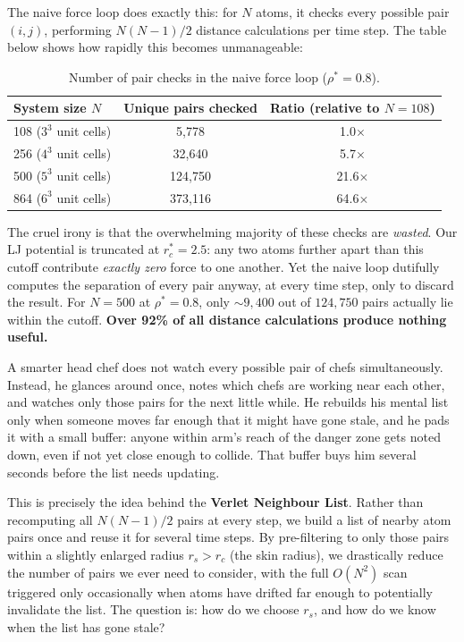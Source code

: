 The naive force loop does exactly this: for $N$ atoms, it checks every possible pair $(i, j)$, performing $N(N-1)/2$ distance calculations per time step. The table below shows how rapidly this becomes unmanageable:

\begin{table}[H]
    \centering
    \caption{Number of pair checks in the naive force loop ($\rho^* = 0.8$).}
    \label{tab:scaling}
    \begin{tabular}{lcc}
        \toprule
        \textbf{System size $N$} & \textbf{Unique pairs checked} & \textbf{Ratio (relative to $N=108$)} \\
        \midrule
        108  ($3^3$ unit cells) & 5{,}778   & 1.0$\times$ \\
        256  ($4^3$ unit cells) & 32{,}640  & 5.7$\times$ \\
        500  ($5^3$ unit cells) & 124{,}750 & 21.6$\times$ \\
        864  ($6^3$ unit cells) & 373{,}116 & 64.6$\times$ \\
        \bottomrule
    \end{tabular}
\end{table}

The cruel irony is that the overwhelming majority of these checks are \emph{wasted}. Our LJ potential is truncated at $r_c^* = 2.5$: any two atoms further apart than this cutoff contribute \emph{exactly zero} force to one another. Yet the naive loop dutifully computes the separation of every pair anyway, at every time step, only to discard the result. For $N = 500$ at $\rho^* = 0.8$, only ${\sim}9{,}400$ out of $124{,}750$ pairs actually lie within the cutoff. \textbf{Over 92\% of all distance calculations produce nothing useful.}

A smarter head chef does not watch every possible pair of chefs simultaneously. Instead, he glances around once, notes which chefs are working near each other, and watches only those pairs for the next little while. He rebuilds his mental list only when someone moves far enough that it might have gone stale, and he pads it with a small buffer: anyone within arm's reach of the danger zone gets noted down, even if not yet close enough to collide. That buffer buys him several seconds before the list needs updating.

This is precisely the idea behind the \textbf{Verlet Neighbour List}. Rather than 
recomputing all $N(N-1)/2$ pairs at every step, we build a list of nearby atom pairs 
once and reuse it for several time steps. By pre-filtering to only those pairs within 
a slightly enlarged radius $r_s > r_c$ (the skin radius), we drastically reduce the 
number of pairs we ever need to consider, with the full $O(N^2)$ scan triggered only 
occasionally when atoms have drifted far enough to potentially invalidate the list. 
The question is: how do we choose $r_s$, and how do we know when the list has gone stale?


